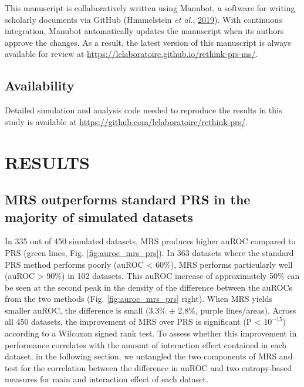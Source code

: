 \documentclass[a4paper,twoside, 9pt]{article}
\begin{document}
\noindent This manuscript is collaboratively written using Manubot, a software for
writing scholarly documents via GitHub (Himmelstein \emph{et al.},
\protect\hyperlink{ref-YuJbg3zO}{2019}). With continuous integration,
Manubot automatically updates the manuscript when its authors approve
the changes. As a result, the latest version of this manuscript is
always available for review at
\url{https://lelaboratoire.github.io/rethink-prs-ms/}.


\subsection{Availability}\label{availability}

\noindent Detailed simulation and analysis code needed to reproduce the results in
this study is available at
\url{https://github.com/lelaboratoire/rethink-prs/}.

\section{\uppercase{Results}}
\subsection{MRS outperforms standard PRS in the majority of simulated
datasets}\label{mrs-outperforms-standard-prs-in-the-majority-of-simulated-datasets}

\noindent In 335 out of 450 simulated datasets, MRS produces higher auROC compared
to PRS (green lines, Fig. \ref{fig:auroc_mrs_prs}). In 363 datasets
where the standard PRS method performs poorly (auROC \textless{} 60\%),
MRS performs particularly well (auROC \textgreater{} 90\%) in 102
datasets. This auROC increase of approximately 50\% can be seen at the second peak in the density of the difference between the auROCs from the two methods (Fig. \ref{fig:auroc_mrs_prs} right).
When MRS yields smaller auROC, the difference is small (3.3\%
$\pm$ 2.8\%, purple lines/areas). Across all 450 datasets, the improvement of
MRS over PRS is significant (P \textless{} \(10^{-15}\)) according to a
Wilcoxon signed rank test. To assess whether this improvement in
performance correlates with the amount of interaction effect contained
in each dataset, in the following section, we untangled the two
components of MRS and test for the correlation between the difference in
auROC and two entropy-based measures for main and interaction effect of
each dataset.
\end{document}

